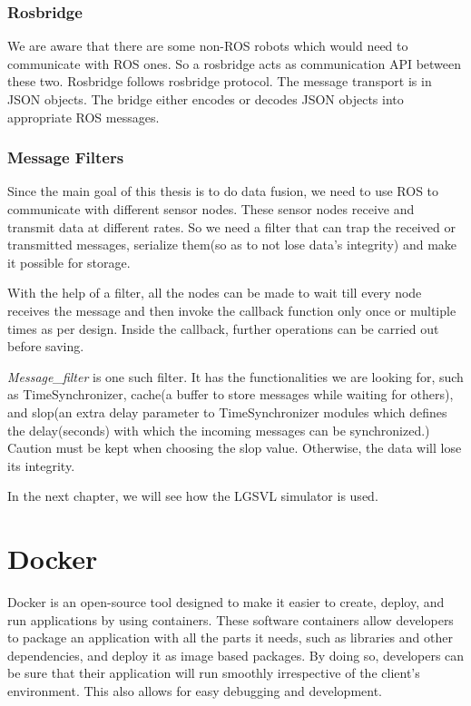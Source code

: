\subsubsection*{Rosbridge}
We are aware that there are some non-ROS robots which would need to communicate with ROS
ones. So a rosbridge \cite{rosbridge} acts as communication API between these two. Rosbridge follows rosbridge protocol. The message transport is in JSON objects. The bridge either encodes or decodes JSON objects into appropriate ROS messages.

\subsubsection*{Message Filters}
Since the main goal of this thesis is to do data fusion, we need to use ROS to communicate
with different sensor nodes. These sensor nodes receive and transmit data at different rates.
So we need a filter that can trap the received or transmitted messages, serialize them(so
as to not lose data's integrity) and make it possible for storage.

With the help of a filter, all the nodes can be made to wait till every node receives the message and then
invoke the callback function only once or multiple times as per design. Inside the callback, further operations can be
carried out before saving.

\textit{Message\_filter} \cite{messagefilters} is one such filter. It has the
functionalities we are looking for, such as TimeSynchronizer, cache(a buffer to store
messages while waiting for others), and slop(an extra delay parameter to TimeSynchronizer
modules which defines the delay(seconds) with which the incoming messages can be
synchronized.) Caution must be kept when choosing the slop value. Otherwise, the data will
lose its integrity.

In the next chapter, we will see how the LGSVL \cite{rong2020lgsvl} simulator is used.

\section{Docker}
Docker \cite{dockergettingstarted} is an open-source tool designed to make it easier to create, deploy, and run applications by
using containers. These software containers allow developers to package an application
with all the parts it needs, such as libraries and other dependencies, and deploy it as
image based packages. By doing so, developers can be sure that their application will run smoothly
irrespective of the client's environment. This also allows for easy debugging and
development.


